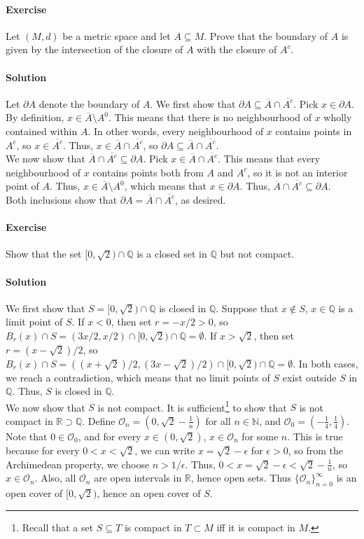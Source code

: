 \documentclass[10pt]{article}
\newcounter{prob}
\def\problem{\stepcounter{prob}\paragraph{Exercise \arabic{prob}}}
\def\solution{\paragraph{Solution}}
\newcommand\cl[1]{\overline{#1}}
\newcommand\inte[1]{{#1}^0}
\def\O{\mathcal{O}}
\begin{document}
        \problem Let $(M, d)$ be a metric space and let $A \subseteq M$. Prove that the boundary of $A$ is given by the intersection of the closure
        of $A$ with the closure of $A^c$.

        \solution Let $\partial A$ denote the boundary of $A$. We first show that $\partial A \subseteq \cl{ A } \cap \cl{ A^c }$.
        Pick $x \in \partial A$. By definition, $x \in \cl{ A }\setminus\inte{ A }$. This means that there is no neighbourhood of $x$
        wholly contained within $A$.
        In other words, every neighbourhood of $x$ contains points in $A^c$, so $x \in \cl{ A^c }$. Thus, $x \in \cl{ A } \cap \cl{ A^c }$, 
        so $\partial A \subseteq \cl{ A } \cap \cl{ A^c }$.\\

        We now show that $\cl{ A } \cap \cl{ A^c } \subseteq \partial A$. Pick $x \in \cl{ A } \cap \cl{ A^c }$. This means that every neighbourhood
        of $x$ contains points both from $A$ and $A^c$, so it is not an interior point of $A$. Thus, $x \in \cl{ A }\setminus\inte{ A }$,
        which means that $x \in \partial A$. Thus, $\cl{ A } \cap \cl{ A^c } \subseteq \partial A$. \\

        Both inclusions show that $\partial A = \cl{ A } \cap \cl{ A^c }$, as desired.

        \problem Show that the set $[0, \sqrt{2}) \cap \mathbb{Q}$ is a closed set in $\mathbb{Q}$ but not compact.

        \solution We first show that $S = [0, \sqrt{2}) \cap \mathbb{Q}$ is closed in $\mathbb{Q}$. Suppose that $x \notin S$, $x \in \mathbb{Q}$
        is a limit point of $S$. If $x < 0$, then set $r = -x /2 > 0$, so $B_{r}(x) \cap S = (3 x/2, x/2) \cap [0, \sqrt{2}) 
        \cap \mathbb{Q} = \emptyset$.
        If $x > \sqrt{2}$, then set $r = (x - \sqrt{2}) /2$, so $B_r(x) \cap S = ((x + \sqrt{2})/2, (3x -\sqrt{2})/2) \cap [0, \sqrt{2})
        \cap \mathbb{Q} = \emptyset$. In both cases, we reach a contradiction, which means that no limit points of $S$ exist outside
        $S$ in $\mathbb{Q}$. Thus, $S$ is closed in $\mathbb{Q}$. \\ 

        We now show that $S$ is not compact. It is sufficient\footnote{
                Recall that a set $S \subseteq T$ is compact in $T \subset M$ iff it is compact in $M$.
        } to show that $S$ is not compact in $\mathbb{R} \supset \mathbb{Q}$.
        Define $\O_n = (0, \sqrt{2} - \frac{1}{n})$ for all $n \in \mathbb{N}$, and $\O_0 = (-\frac{1}{4}, \frac{1}{4})$.
        Note that $0 \in \O_0$, and for every $x \in (0, \sqrt{2})$, $x \in \O_n$ for some $n$.
        This is true because for every $0 < x < \sqrt{2}$, we can write $x = \sqrt{2} - \epsilon$ for $\epsilon > 0$,
        so from the Archimedean property, we choose $n > 1 /\epsilon$. Thus, $0 < x = \sqrt{2} - \epsilon < \sqrt{2} - \frac{1}{n}$,
        so $x \in \O_n$. Also, all $\O_n$ are open intervals in $\mathbb{R}$,
        hence open sets. Thus $\{\O_n\}_{n = 0}^\infty$ is an open cover of $[0, \sqrt{2})$, hence an open cover of $S$. \\
\end{document}

